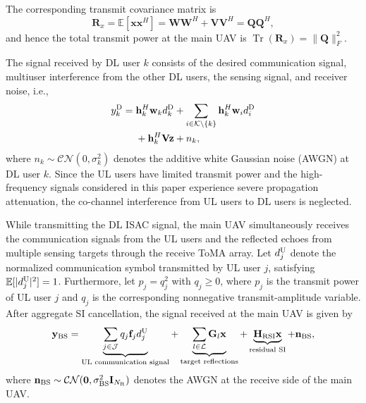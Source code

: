 \documentclass[letterpaper,journal]{IEEEtran}
\begin{document}
The corresponding transmit covariance matrix is
\begin{equation}
\mathbf R_x
=
\mathbb E[\mathbf x\mathbf x^H]
=
\mathbf W\mathbf W^H
+
\mathbf V\mathbf V^H
=
\mathbf Q\mathbf Q^H,
\label{eq:tx_covariance}
\end{equation}
and hence the total transmit power at the main UAV is $\operatorname{Tr}(\mathbf R_x)=\|\mathbf Q\|_F^2$.

The signal received by DL user $k$ consists of the desired communication signal, multiuser interference from the other DL users, the sensing signal, and receiver noise, i.e.,
\begin{equation}
\begin{aligned}
y_k^{\rm D}
={}&
\mathbf h_k^H\mathbf w_kd_k^{\rm D}
+
\sum_{i\in\mathcal K\setminus\{k\}}
\mathbf h_k^H\mathbf w_i d_i^{\rm D}
\\
&+
\mathbf h_k^H\mathbf V\mathbf z
+
n_k,
\end{aligned}
\label{eq:dl_received_signal}
\end{equation}
where $n_k\sim\mathcal{CN}(0,\sigma_k^2)$ denotes the additive white Gaussian noise (AWGN) at DL user $k$. Since the UL users have limited transmit power and the high-frequency signals considered in this paper experience severe propagation attenuation, the co-channel interference from UL users to DL users is neglected.

While transmitting the DL ISAC signal, the main UAV simultaneously receives the communication signals from the UL users and the reflected echoes from multiple sensing targets through the receive ToMA array. Let $d_j^{\rm U}$ denote the normalized communication symbol transmitted by UL user $j$, satisfying $\mathbb E[|d_j^{\rm U}|^2]=1$. Furthermore, let $p_j=q_j^2$ with $q_j\ge0$, where $p_j$ is the transmit power of UL user $j$ and $q_j$ is the corresponding nonnegative transmit-amplitude variable. After aggregate SI cancellation, the signal received at the main UAV is given by
\begin{equation}
\mathbf y_{\rm BS}
=
\underbrace{
\sum_{j\in\mathcal J}
q_j\mathbf f_jd_j^{\rm U}
}_{\text{UL communication signal}}
+
\underbrace{
\sum_{l\in\mathcal L}
\mathbf G_l\mathbf x
}_{\text{target reflections}}
+
\underbrace{
\mathbf H_{\rm RSI}\mathbf x
}_{\text{residual SI}}
+
\mathbf n_{\rm BS},
\label{eq:bs_received_signal}
\end{equation}
where $\mathbf n_{\rm BS}\sim\mathcal{CN}(\mathbf 0,\sigma_{\rm BS}^2\mathbf I_{N_{\rm R}})$ denotes the AWGN at the receive side of the main UAV.
\end{document}
